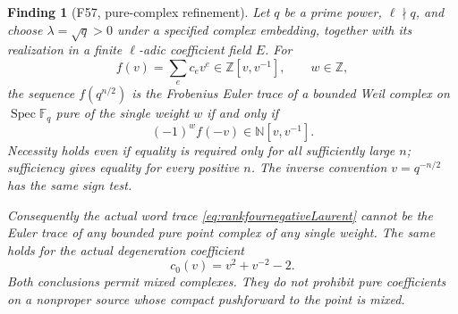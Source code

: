 \documentclass[11pt,a4paper]{article}
\newcommand{\fid}[1]{\textsf{#1}}\newcommand{\gate}[1]{\textsf{#1}}
\theoremstyle{named}\newtheorem{finding}{Finding}[section]
\theoremstyle{definition}\newtheorem{definition}[finding]{Definition}
\theoremstyle{remark}\newtheorem{remark}[finding]{Remark}
\begin{document}
\begin{finding}[\fid{F57}, pure-complex refinement]
\label{f:purepointLaurentcriterion}
Let \(q\) be a prime power, \(\ell\nmid q\), and choose
\(\lambda=\sqrt q>0\) under a specified complex embedding,
together with its realization in a finite \(\ell\)-adic
coefficient field \(E\).
For
\[
 f(v)=\sum_e c_ev^e\in\mathbb Z[v,v^{-1}],\qquad w\in\mathbb Z,
\]
the sequence \(f(q^{n/2})\) is the Frobenius Euler trace of a
bounded Weil complex on \(\operatorname{Spec}\mathbb F_q\)
pure of the single weight \(w\) if and only if
\begin{equation}\label{eq:purepointLaurentsign}
                 (-1)^w f(-v)\in\mathbb N[v,v^{-1}].
\end{equation}
Necessity holds even if equality is required only for all
sufficiently large \(n\); sufficiency gives equality for every
positive \(n\). The inverse convention \(v=q^{-n/2}\) has the
same sign test.

Consequently the actual word trace
\eqref{eq:rankfournegativeLaurent} cannot be the Euler trace
of any bounded pure point complex of any single weight.
The same holds for the actual degeneration coefficient
\[
                   c_0(v)=v^2+v^{-2}-2.
\]
Both conclusions permit mixed complexes. They do not prohibit
pure coefficients on a nonproper source whose compact
pushforward to the point is mixed.
\end{finding}
\end{document}

